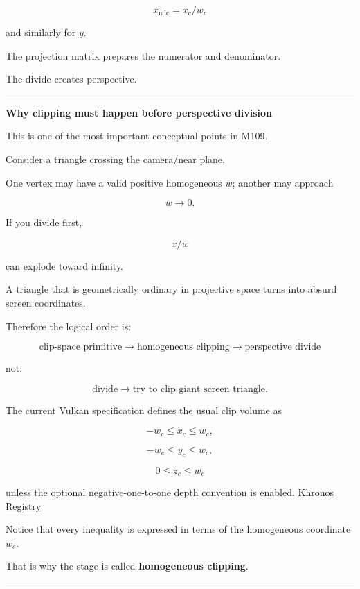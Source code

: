 \[
\boxed{x_{\text{ndc}} = x_c/w_c}
\]

and similarly for \(y\).

The projection matrix prepares the numerator and denominator.

The divide creates perspective.

\begin{center}\rule{0.5\linewidth}{0.5pt}\end{center}

\textbf{Why clipping must happen before perspective division}

This is one of the most important conceptual points in M109.

Consider a triangle crossing the camera/near plane.

One vertex may have a valid positive homogeneous \(w\); another may approach

\[
w\rightarrow0.
\]

If you divide first,

\[
x/w
\]

can explode toward infinity.

A triangle that is geometrically ordinary in projective space turns into absurd screen coordinates.

Therefore the logical order is:

\[
\boxed{
\text{clip-space primitive}
\rightarrow
\text{homogeneous clipping}
\rightarrow
\text{perspective divide}
}
\]

not:

\[
\text{divide}
\rightarrow
\text{try to clip giant screen triangle}.
\]

The current Vulkan specification defines the usual clip volume as

\[
-w_c\le x_c\le w_c,
\]

\[
-w_c\le y_c\le w_c,
\]

\[
0\le z_c\le w_c
\]

unless the optional negative-one-to-one depth convention is enabled. \href{https://registry.khronos.org/vulkan/specs/latest-ratified/pdf/vkspec.pdf?utm_source=chatgpt.com}{Khronos Registry}

Notice that every inequality is expressed in terms of the homogeneous coordinate \(w_c\).

That is why the stage is called \textbf{homogeneous clipping}.

\begin{center}\rule{0.5\linewidth}{0.5pt}\end{center}

